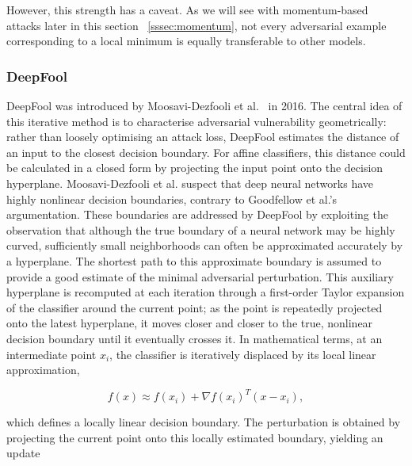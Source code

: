 \documentclass[review]{AIM_report}
\begin{document}
However, this strength has a caveat. As we will see with momentum-based attacks later in this section ~\ref{sssec:momentum}, not every adversarial example corresponding to a local minimum is equally transferable to other models.




\subsubsection{DeepFool}
 DeepFool was introduced by Moosavi-Dezfooli et al.~\cite{moosavi2016deepfool} in 2016. The central idea of this iterative method is to characterise adversarial vulnerability geometrically: rather than loosely optimising an attack loss, DeepFool estimates the distance of an input to the closest decision boundary. For affine classifiers, this distance could be calculated in a closed form by projecting the input point onto the decision hyperplane. Moosavi-Dezfooli et al. suspect that deep neural networks have highly nonlinear decision boundaries, contrary to Goodfellow et al.'s argumentation. These boundaries are addressed by DeepFool by exploiting the observation that although the true boundary of a neural network may be highly curved, sufficiently small neighborhoods can often be approximated accurately by a hyperplane. The shortest path to this approximate boundary is assumed to provide a good estimate of the minimal adversarial perturbation. This auxiliary hyperplane is recomputed at each iteration through a first-order Taylor expansion of the classifier around the current point; as the point is repeatedly projected onto the latest hyperplane, it moves closer and closer to the true, nonlinear decision boundary until it eventually crosses it. In mathematical terms, at an intermediate point $x_i$, the classifier is iteratively displaced by its local linear approximation,                                   

\begin{equation}
    f(x) \approx f(x_i) + \nabla f(x_i)^T(x-x_i),
\end{equation}

which defines a locally linear decision boundary. The perturbation is obtained by projecting the current point onto this locally estimated boundary, yielding an update
\end{document}
